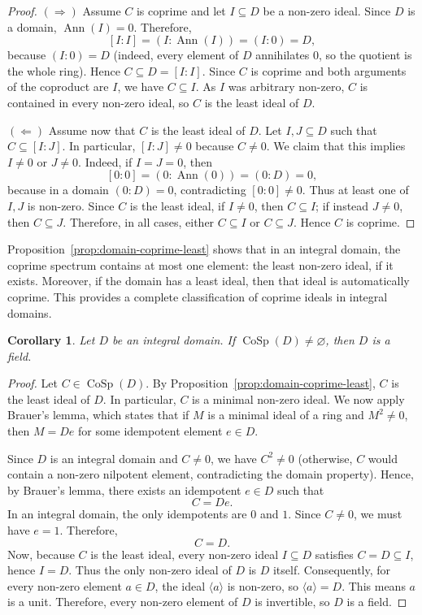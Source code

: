 \documentclass{amsart}
\newtheorem{corollary}{Corollary}
\DeclareMathOperator{\ann}{Ann}
\begin{document}
\begin{proof}
$(\Rightarrow)$ Assume $C$ is coprime and let $I \subseteq D$ be a non-zero ideal. Since $D$ is a domain, $\ann(I)=0$. Therefore,
\[
[I:I] = (I:\ann(I)) = (I:0) = D,
\]
because $(I:0) = D$ (indeed, every element of $D$ annihilates $0$, so the quotient is the whole ring). Hence $C \subseteq D = [I:I]$. Since $C$ is coprime and both arguments of the coproduct are $I$, we have $C \subseteq I$. As $I$ was arbitrary non-zero, $C$ is contained in every non-zero ideal, so $C$ is the least ideal of $D$.

$(\Leftarrow)$ Assume now that $C$ is the least ideal of $D$. Let $I,J \subseteq D$ such that $C \subseteq [I:J]$. In particular, $[I:J] \neq 0$ because $C \neq 0$. We claim that this implies $I \neq 0$ or $J \neq 0$. Indeed, if $I=J=0$, then
\[
[0:0] = (0:\ann(0)) = (0:D) = 0,
\]
because in a domain $(0:D)=0$, contradicting $[0:0] \neq 0$. Thus at least one of $I,J$ is non-zero. Since $C$ is the least ideal, if $I \neq 0$, then $C \subseteq I$; if instead $J \neq 0$, then $C \subseteq J$. Therefore, in all cases, either $C \subseteq I$ or $C \subseteq J$. Hence $C$ is coprime.
\end{proof}

Proposition~\ref{prop:domain-coprime-least} shows that in an integral domain, the coprime spectrum contains at most one element: the least non-zero ideal, if it exists. Moreover, if the domain has a least ideal, then that ideal is automatically coprime. This provides a complete classification of coprime ideals in integral domains.

\begin{corollary}\label{cor:domain-field}
Let $D$ be an integral domain. If $\operatorname{CoSp}(D) \neq \varnothing$, then $D$ is a field.
\end{corollary}

\begin{proof}
Let $C \in \operatorname{CoSp}(D)$. By Proposition~\ref{prop:domain-coprime-least}, $C$ is the least ideal of $D$. In particular, $C$ is a minimal non-zero ideal. We now apply Brauer's lemma, which states that if $M$ is a minimal ideal of a ring and $M^2 \neq 0$, then $M = De$ for some idempotent element $e \in D$.

Since $D$ is an integral domain and $C \neq 0$, we have $C^2 \neq 0$ (otherwise, $C$ would contain a non-zero nilpotent element, contradicting the domain property). Hence, by Brauer's lemma, there exists an idempotent $e \in D$ such that
\[
C = De.
\]
In an integral domain, the only idempotents are $0$ and $1$. Since $C \neq 0$, we must have $e = 1$. Therefore,
\[
C = D.
\]
Now, because $C$ is the least ideal, every non-zero ideal $I \subseteq D$ satisfies $C = D \subseteq I$, hence $I = D$. Thus the only non-zero ideal of $D$ is $D$ itself. Consequently, for every non-zero element $a \in D$, the ideal $\langle a \rangle$ is non-zero, so $\langle a \rangle = D$. This means $a$ is a unit. Therefore, every non-zero element of $D$ is invertible, so $D$ is a field.
\end{proof}
\end{document}
